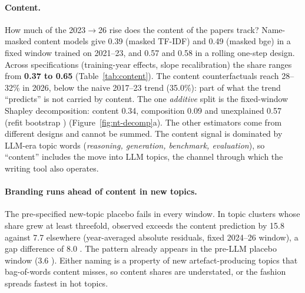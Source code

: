 \paragraph{Content.}
How much of the 2023$\rightarrow$26 rise does the content of the papers track? Name-masked content models give 0.39  (masked TF-IDF) and 0.49  (masked bge) in a fixed window trained on 2021--23, and 0.57  and 0.58  in a rolling one-step design. Across specifications (training-year effects, slope recalibration) the share ranges from \textbf{0.37 to 0.65} (Table~\ref{tab:content}). The content counterfactuals reach 28--32\% in 2026, below the naive 2017--23 trend (35.0\%): part of what the trend ``predicts'' is not carried by content. The one \emph{additive} split is the fixed-window Shapley decomposition: content 0.34, composition 0.09 and unexplained 0.57 (refit bootstrap ) (Figure~\ref{fig:nt-decomp}a). The other estimators come from different designs and cannot be summed. The content signal is dominated by LLM-era topic words (\emph{reasoning, generation, benchmark, evaluation}), so ``content'' includes the move into LLM topics, the channel through which the writing tool also operates.

\paragraph{Branding runs ahead of content in new topics.}
The pre-specified new-topic placebo fails in every window. In topic clusters whose share grew at least threefold, observed \NAME{} exceeds the content prediction by 15.8\pp{} against 7.7\pp{} elsewhere (year-averaged absolute residuals, fixed 2024--26 window), a gap difference of 8.0\pp{} . The pattern already appears in the pre-LLM placebo window (3.6\pp{} ). Either naming is a property of new artefact-producing topics that bag-of-words content misses, so content shares are understated, or the fashion spreads fastest in hot topics.

